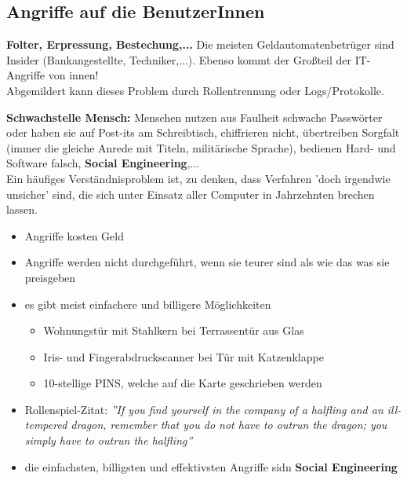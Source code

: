 \subsection{Angriffe auf die BenutzerInnen}
\textbf{Folter, Erpressung, Bestechung,...} Die meisten Geldautomatenbetrüger sind Insider (Bankangestellte, Techniker,...). Ebenso kommt der Großteil der IT-Angriffe von innen! \\
Abgemildert kann dieses Problem durch Rollentrennung oder Logs/Protokolle.

\textbf{Schwachstelle Mensch:} Menschen nutzen aus Faulheit schwache Passwörter oder haben sie auf Post-its am Schreibtisch, chiffrieren nicht, übertreiben Sorgfalt (immer die gleiche Anrede mit Titeln, militärische Sprache), bedienen Hard- und Software falsch, \textbf{Social Engineering},... \\

Ein häufiges Verständnisproblem ist, zu denken, dass Verfahren 'doch irgendwie unsicher' sind, die sich unter Einsatz aller Computer in Jahrzehnten brechen lassen.
\begin{itemize}
	\item Angriffe kosten Geld
	\item Angriffe werden nicht durchgeführt, wenn sie teurer sind als wie das was sie preisgeben
	\item es gibt meist einfachere und billigere Möglichkeiten
	\begin{itemize}
		\item Wohnungstür mit Stahlkern bei Terrassentür aus Glas
		\item Iris- und Fingerabdruckscanner bei Tür mit Katzenklappe
		\item 10-stellige PINS, welche auf die Karte geschrieben werden
	\end{itemize}
	\item Rollenspiel-Zitat: \textit{''If you find yourself in the company of a halfling and an ill-tempered dragon, remember that you do not have to outrun the dragon; you simply have to outrun the halfling''}
	\item die einfachsten, billigsten und effektivsten Angriffe sidn \textbf{Social Engineering}
\end{itemize}

